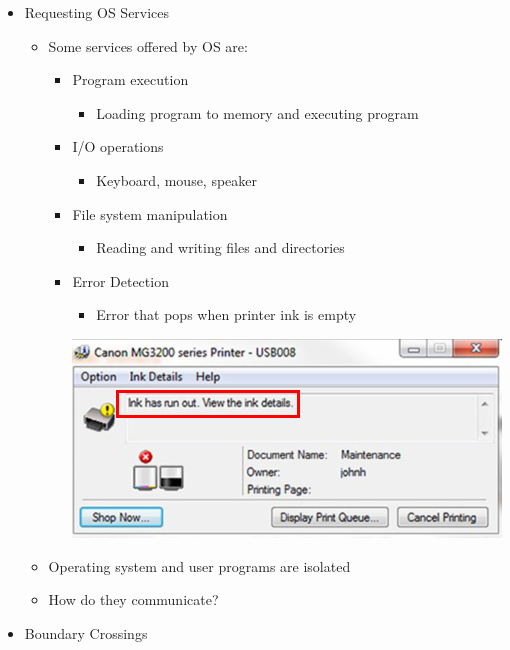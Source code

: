 \documentclass[12pt]{article}
\begin{document}
\begin{itemize}
    \item Requesting OS Services
    \begin{itemize}
        \item Some services offered by OS are:
        \begin{itemize}
            \item Program execution
            \begin{itemize}
                \item Loading program to memory and executing program
            \end{itemize}
            \item I/O operations
            \begin{itemize}
                \item Keyboard, mouse, speaker
            \end{itemize}
            \item File system manipulation
            \begin{itemize}
                \item Reading and writing files and directories
            \end{itemize}

            \item Error Detection
            \begin{itemize}
                \item Error that pops when printer ink is empty
            \end{itemize}

            \begin{center}
            \includegraphics[width=0.7\linewidth]{images/week_2_notes_1_6.png}
            \end{center}
        \end{itemize}

        \item Operating system and user programs are isolated

        \item How do they communicate?
    \end{itemize}
    \item Boundary Crossings


\end{itemize}
\end{document}
